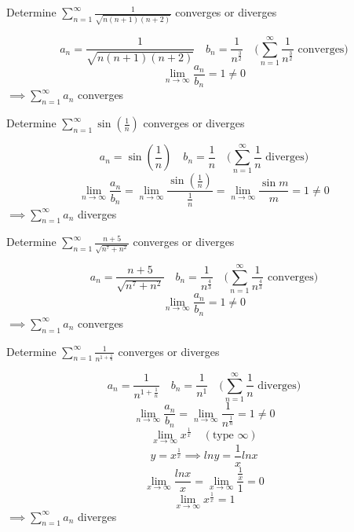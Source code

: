 \begin{eg}
Determine \(\displaystyle \sum^{\infty}_{n = 1} \frac{1}{\sqrt{n(n + 1)(n + 2)}}\) converges or diverges

\soln
\[\displaystyle a_n = \frac{1}{\sqrt{n(n + 1)(n + 2)}} \quad b_n = \frac{1}{n^{\frac{3}{2}}} \quad (\sum^{\infty}_{n = 1} \frac{1}{n^{\frac{3}{2}}} \text{ converges)}\]
\[\displaystyle \lim_{n \to \infty} \frac{a_n}{b_n} = 1 \neq 0\]
\(\implies \displaystyle \sum^{\infty}_{n = 1} a_n\) converges
\end{eg}
\begin{eg}
Determine \(\displaystyle \sum^{\infty}_{n = 1} \sin (\frac{1}{n})\) converges or diverges

\soln
\[\displaystyle a_n = \sin (\frac{1}{n}) \quad b_n = \frac{1}{n} \quad (\sum^{\infty}_{n = 1} \frac{1}{n} \text{  diverges)}\]
\[\displaystyle \lim_{n \to \infty} \frac{a_n}{b_n} = \lim_{n \to \infty} \frac{\sin(\frac{1}{n})}{\frac{1}{n}} = \lim_{n \to \infty} \frac{\sin m}{m} = 1 \neq 0\]
\(\implies \displaystyle \sum^{\infty}_{n = 1} a_n\) diverges
\end{eg}
\begin{eg}
Determine \(\displaystyle \sum^{\infty}_{n = 1} \frac{n + 5}{\sqrt{n^7 + n^2}}\) converges or diverges

\soln
\[\displaystyle a_n = \frac{n + 5}{\sqrt{n^7 + n^2}} \quad b_n = \frac{1}{n^{\frac{4}{3}}} \quad (\sum^{\infty}_{n = 1} \frac{1}{n^{\frac{4}{3}}} \text{ converges)}\]
\[\displaystyle \lim_{n \to \infty} \frac{a_n}{b_n} = 1 \neq 0\]
\(\implies \displaystyle \sum^{\infty}_{n = 1} a_n\) converges
\end{eg}
\begin{eg}
Determine \(\displaystyle \sum^{\infty}_{n = 1} \frac{1}{n^{1 + \frac{1}{n}}}\) converges or diverges

\soln
\[\displaystyle a_n = \frac{1}{n^{1 + \frac{1}{n}}} \quad b_n = \frac{1}{n^1} \quad (\sum^{\infty}_{n = 1} \frac{1}{n} \text{ diverges)}\]
\[\displaystyle \lim_{n \to \infty} \frac{a_n}{b_n} = \lim_{n \to \infty} \frac{1}{n^{\frac{1}{n}}} = 1 \neq 0\]
\[\displaystyle \lim_{x \to \infty} x^{\frac{1}{x}} \quad (\text{type } \infty)\]
\[\displaystyle y = x^{\frac{1}{x}} \implies ln y = \frac{1}{x} lnx\]
\[\displaystyle \lim_{x \to \infty} \frac{lnx}{x} = \lim_{x \to \infty} \frac{\frac{1}{x}}{1} = 0\]
\[\displaystyle \lim_{x \to \infty} x^{\frac{1}{x}} = 1\]
\(\implies \displaystyle \sum^{\infty}_{n = 1} a_n\) diverges
\end{eg}
